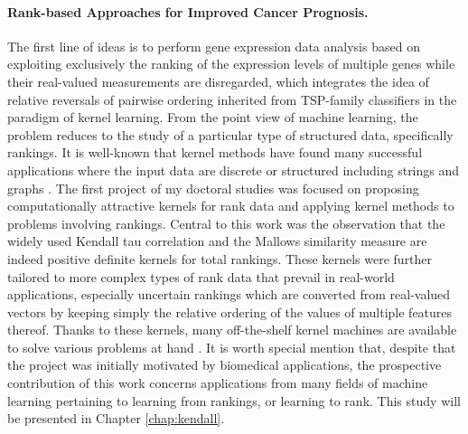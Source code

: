 \paragraph{Rank-based Approaches for Improved Cancer Prognosis.}

The first line of ideas is to perform gene expression data analysis based on exploiting exclusively the ranking of the expression levels of multiple genes while their real-valued measurements are disregarded, which integrates the idea of relative reversals of pairwise ordering inherited from TSP-family classifiers in the paradigm of kernel learning. From the point view of machine learning, the problem reduces to the study of a particular type of structured data, specifically rankings. It is well-known that kernel methods have found many successful applications where the input data are discrete or structured including strings and graphs \cite{Gaertner2004Kernels}. The first project of my doctoral studies was focused on proposing computationally attractive kernels for rank data and applying kernel methods to problems involving rankings. Central to this work was the observation that the widely used Kendall tau correlation and the Mallows similarity measure are indeed positive definite kernels for total rankings. These kernels were further tailored to more complex types of rank data that prevail in real-world applications, especially uncertain rankings which are converted from real-valued vectors by keeping simply the relative ordering of the values of multiple features thereof. Thanks to these kernels, many off-the-shelf kernel machines are available to solve various problems at hand \cite{Shawe-Taylor2004Kernel, Schoelkopf2004Kernel}. It is worth special mention that, despite that the project was initially motivated by biomedical applications, the prospective contribution of this work concerns applications from many fields of machine learning pertaining to learning from rankings, or learning to rank. This study will be presented in Chapter \ref{chap:kendall}.


